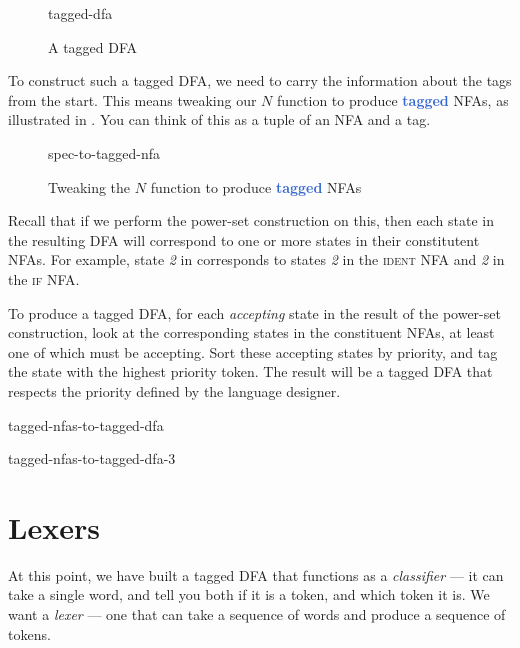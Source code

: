 \begin{figure}[H]
    \centering
    {tagged-dfa}
    \caption{A tagged DFA}
    \label{fig:tagged-dfa}
\end{figure}

To construct such a tagged DFA, we need to carry the information about the tags from the start. This means tweaking our $N$ function to produce \textbf{\textcolor{highlight}{tagged}} NFAs, as illustrated in . You can think of this as a tuple of an NFA and a tag.

\begin{figure}[H]
    \centering
    {spec-to-tagged-nfa}
    \caption{Tweaking the $N$ function to produce \textbf{\textcolor{highlight}{tagged}} NFAs}
    \label{fig:tagged-nfas}
\end{figure}

Recall that if we perform the power-set construction on this, then each state in the resulting DFA will correspond to one or more states in their constitutent NFAs. For example, state \emph{2} in  corresponds to states \emph{2} in the \textsc{ident} NFA and \emph{2} in the \textsc{if} NFA.

To produce a tagged DFA, for each \emph{accepting} state in the result of the power-set construction, look at the corresponding states in the constituent NFAs, at least one of which must be accepting. Sort these accepting states by priority, and tag the state with the highest priority token. The result will be a tagged DFA that respects the priority defined by the language designer.

\begin{minipage}[t]{0.5\textwidth}
    \begin{center}
    {tagged-nfas-to-tagged-dfa}
    \end{center}
\end{minipage}%
\begin{minipage}[t]{0.5\textwidth}
    \begin{center}
    {tagged-nfas-to-tagged-dfa-3}
    \end{center}
\end{minipage}

\section{Lexers}
At this point, we have built a tagged DFA that functions as a \emph{classifier} --- it can take a single word, and tell you both if it is a token, and which token it is. We want a \emph{lexer} --- one that can take a sequence of words and produce a sequence of tokens. 

